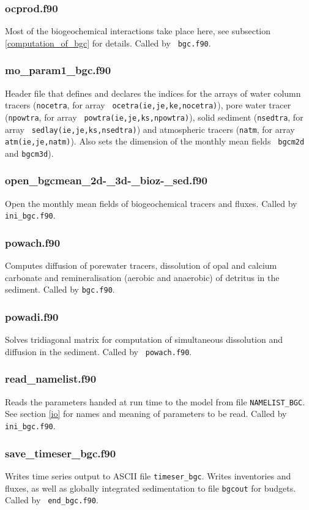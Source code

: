 \documentclass[11pt,a4paper,fleqn,twoside]{article}
\begin{document}
\subsubsection{ocprod.f90} Most of the biogeochemical interactions take place
here, see subsection \ref{computation_of_bgc} for details. Called by {\tt
bgc.f90}.

\subsubsection{mo\_param1\_bgc.f90} Header file that defines and declares the
indices for the arrays of water column tracers ({\tt nocetra}, for array {\tt
ocetra(ie,je,ke,nocetra)}), pore water tracer ({\tt npowtra}, for array {\tt
powtra(ie,je,ks,npowtra)}), solid sediment ({\tt nsedtra}, for array {\tt
sedlay(ie,je,ks,nsedtra)}) and atmospheric tracers ({\tt natm}, for array {\tt
atm(ie,je,natm)}). Also sets the dimension of the monthly mean fields {\tt
bgcm2d} and {\tt bgcm3d}). 

\subsubsection{open\_bgcmean\_2d-\_3d-\_bioz-\_sed.f90} Open the monthly mean fields of
biogeochemical tracers and fluxes. Called by {\tt ini\_bgc.f90}.

\subsubsection{powach.f90} Computes diffusion of porewater tracers, dissolution
of opal and calcium carbonate and remineralisation (aerobic and anaerobic) of
detritus in the sediment. Called by {\tt bgc.f90}.


\subsubsection{powadi.f90} Solves tridiagonal matrix for computation of
simultaneous dissolution and diffusion in the sediment. Called by {\tt
powach.f90}.

\subsubsection{read\_namelist.f90} Reads the parameters handed at run time to
the model from file {\tt NAMELIST\_BGC}. See section \ref{io} for  names and
meaning of parameters to be read. Called by  {\tt ini\_bgc.f90}.

\subsubsection{save\_timeser\_bgc.f90} Writes time series output to ASCII
file {\tt timeser\_bgc}. Writes inventories and fluxes, as well as globally
integrated sedimentation to file {\tt bgcout} for budgets. Called by {\tt
end\_bgc.f90}.
\end{document}
